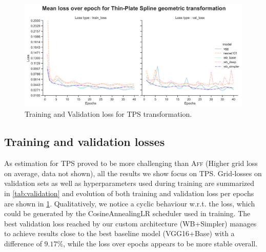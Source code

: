 \documentclass[10pt,conference,compsocconf]{IEEEtran}
\begin{document}
\begin{figure}[h!]
    \centering
    \includegraphics[scale = 0.322]{tps_loss.png}
    \vspace{-0.55cm}
    \caption{Training and Validation loss for TPS transformation.}
    \label{fig:tps_loss}
\end{figure}
\vspace{-0.5cm}

\subsection{Training and validation losses} 
As estimation for \textsc{TPS} proved to be more challenging than \textsc{Aff} (Higher grid loss on average, data not shown), all the results we show focus on \textsc{TPS}. Grid-losses on validation sets as well as hyperparameters used during training are summarized in \ref{tab:validation} and evolution of both training and validation loss per epochs are shown in \ref{fig:tps_loss}. Qualitatively, we notice a cyclic behaviour w.r.t. the loss, which could be generated by the CosineAnnealingLR scheduler used in training. The best validation loss reached by our custom architecture (WB+Simpler) manages to achieve results close to the best baseline model (VGG16+Base) with a difference of $9.17\%$, while the loss over epochs appears to be more stable overall. 
\end{document}

